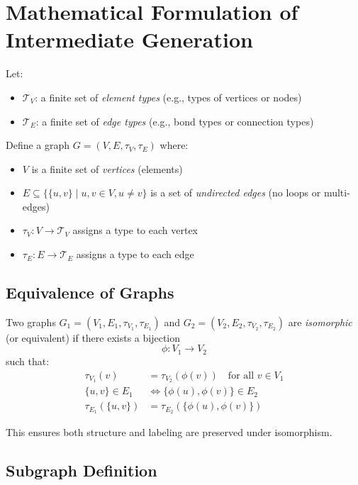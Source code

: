 \documentclass{article}
\begin{document}
\section*{Mathematical Formulation of Intermediate Generation}

Let:
\begin{itemize}
    \item \( \mathcal{T}_V \): a finite set of \emph{element types} (e.g., types of vertices or nodes)
    \item \( \mathcal{T}_E \): a finite set of \emph{edge types} (e.g., bond types or connection types)
\end{itemize}

Define a graph \( G = (V, E, \tau_V, \tau_E) \) where:
\begin{itemize}
    \item \( V \) is a finite set of \emph{vertices} (elements)
    \item \( E \subseteq \{ \{u, v\} \mid u, v \in V, u \neq v \} \) is a set of \emph{undirected edges} (no loops or multi-edges)
    \item \( \tau_V: V \to \mathcal{T}_V \) assigns a type to each vertex
    \item \( \tau_E: E \to \mathcal{T}_E \) assigns a type to each edge
\end{itemize}

\subsection*{Equivalence of Graphs}

Two graphs \( G_1 = (V_1, E_1, \tau_{V_1}, \tau_{E_1}) \) and \( G_2 = (V_2, E_2, \tau_{V_2}, \tau_{E_2}) \) are \emph{isomorphic} (or equivalent) if there exists a bijection
\[
\phi: V_1 \to V_2
\]
such that:
\begin{align*}
\tau_{V_1}(v) &= \tau_{V_2}(\phi(v)) \quad \text{for all } v \in V_1 \\
\{u, v\} \in E_1 &\iff \{\phi(u), \phi(v)\} \in E_2 \\
\tau_{E_1}(\{u, v\}) &= \tau_{E_2}(\{\phi(u), \phi(v)\})
\end{align*}

This ensures both structure and labeling are preserved under isomorphism.

\subsection*{Subgraph Definition}
\end{document}
